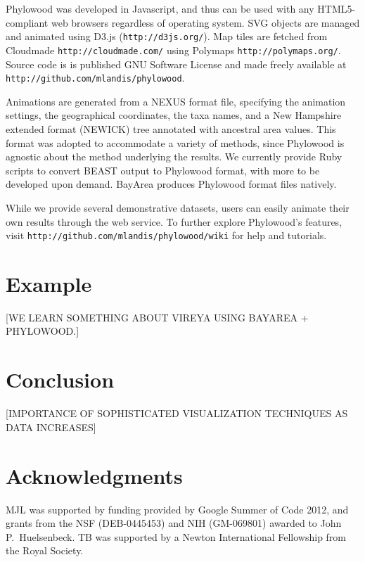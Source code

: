 \documentclass[11pt]{article}
\begin{document}
Phylowood was developed in Javascript, and thus can be used with any HTML5-compliant web browsers regardless of operating system. SVG objects are managed and animated using D3.js (\texttt{http://d3js.org/}). Map tiles are fetched from Cloudmade \texttt{http://cloudmade.com/} using Polymaps \texttt{http://polymaps.org/}. Source code is is published GNU Software License and made freely available at \texttt{http://github.com/mlandis/phylowood}.

Animations are generated from a NEXUS format file, specifying the animation settings, the geographical coordinates, the taxa names, and a New Hampshire extended format (NEWICK) tree annotated with ancestral area values. This format was adopted to accommodate a variety of methods, since Phylowood is agnostic about the method underlying the results. We currently provide Ruby scripts to convert BEAST output to Phylowood format, with more to be developed upon demand. BayArea produces Phylowood format files natively.

While we provide several demonstrative datasets, users can easily animate their own results through the web service. To further explore Phylowood's features, visit \texttt{http://github.com/mlandis/phylowood/wiki} for help and tutorials.

\section{Example}

[WE LEARN SOMETHING ABOUT VIREYA USING BAYAREA + PHYLOWOOD.]

\section{Conclusion}

[IMPORTANCE OF SOPHISTICATED VISUALIZATION TECHNIQUES AS DATA INCREASES]

\section*{Acknowledgments}

MJL was supported by funding provided by Google Summer of Code 2012, and grants from the NSF (DEB-0445453) and NIH (GM-069801) awarded to John P.\ Huelsenbeck.  TB was supported by a Newton International Fellowship from the Royal Society.  



\newpage
\end{document}
